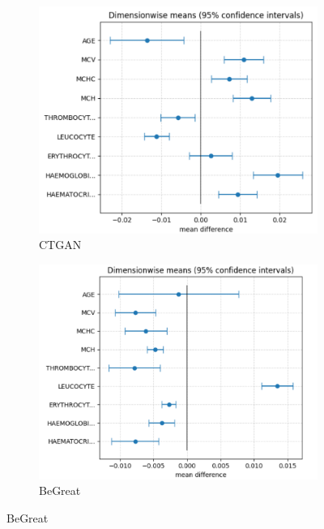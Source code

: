 \begin{figure}[H]
    \centering
    \begin{subfigure}[b]{0.47\textwidth}
        \centering
        \includegraphics[width=\textwidth]{images/avg_dim_2_ctgan.png}
        \caption{CTGAN}
        \label{fig:avg_dim_2_ctgan}
    \end{subfigure}
    \hfill
    \begin{subfigure}[b]{0.47\textwidth}
        \centering
        \includegraphics[width=\textwidth]{images/avg_dim_2_begreat.png}
        \caption{BeGreat}
        \label{fig:avg_dim_2_begreat}
    \end{subfigure}

\end{figure}
